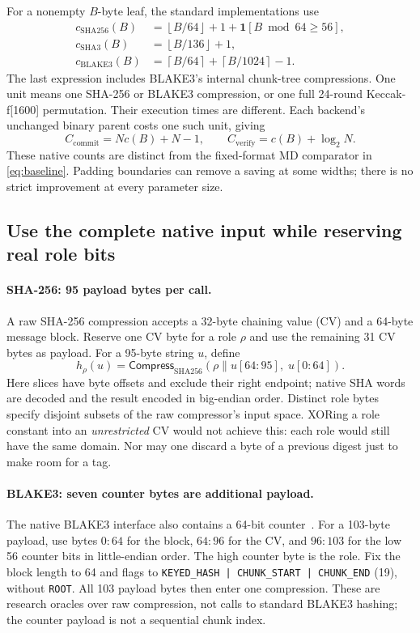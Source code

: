 \documentclass[11pt,letterpaper]{article}
\theoremstyle{definition} %
\newcommand{\floor}[1]{\ensuremath{\left\lfloor#1\right\rfloor}}
\newcommand{\ceil}[1]{\ensuremath{\left\lceil#1\right\rceil}}
\newcommand{\concat}{\|}
\begin{document}
For a nonempty $B$-byte leaf, the standard implementations use
\begin{align}
 c_{\mathrm{SHA256}}(B)
   &=\floor{B/64}+1+\mathbf{1}[B\bmod64\geq56],\nonumber\\
 c_{\mathrm{SHA3}}(B)&=\floor{B/136}+1,\nonumber\\
 c_{\mathrm{BLAKE3}}(B)
   &=\ceil{B/64}+\ceil{B/1024}-1.
 \label{eq:native-standard}
\end{align}
The last expression includes BLAKE3's internal chunk-tree compressions.
One unit means one SHA-256 or BLAKE3 compression, or one full 24-round
Keccak-f[1600] permutation. Their execution times are different. Each
backend's unchanged binary parent costs one such unit, giving
\[
 C_{\mathrm{commit}}=N c(B)+N-1,\qquad
 C_{\mathrm{verify}}=c(B)+\log_2N.
\]
These native counts are distinct from the fixed-format MD comparator in
\eqref{eq:baseline}. Padding boundaries can remove a saving at some widths;
there is no strict improvement at every parameter size.

\subsection{Use the complete native input while reserving real role bits}
\paragraph{SHA-256: 95 payload bytes per call.}
A raw SHA-256 compression accepts a 32-byte chaining value (CV) and a
64-byte message block. Reserve one CV byte for a role $\rho$ and use the
remaining 31 CV bytes as payload. For a 95-byte string $u$, define
\[
 h_\rho(u)=\mathsf{Compress}_{\mathrm{SHA256}}
       (\rho\concat u[64{:}95],\;u[0{:}64]).
\]
Here slices have byte offsets and exclude their right endpoint; native SHA
words are decoded and the result encoded in big-endian order. Distinct role
bytes specify disjoint subsets of the raw compressor's input space. XORing
a role constant into an \emph{unrestricted} CV would not achieve this:
each role would still have the same domain. Nor may one discard a byte of
a previous digest just to make room for a tag.

\paragraph{BLAKE3: seven counter bytes are additional payload.}
The native BLAKE3 interface also contains a 64-bit counter~\cite{BLAKE3}.
For a 103-byte payload, use bytes $0{:}64$ for the block, $64{:}96$ for
the CV, and $96{:}103$ for the low 56 counter bits in little-endian order.
The high counter byte is the role. Fix the block length to 64 and flags to
\texttt{KEYED\_HASH | CHUNK\_START | CHUNK\_END} (19), without
\texttt{ROOT}. All 103 payload bytes then enter one compression. These are
research oracles over raw compression, not calls to standard BLAKE3 hashing;
the counter payload is not a sequential chunk index.
\end{document}

